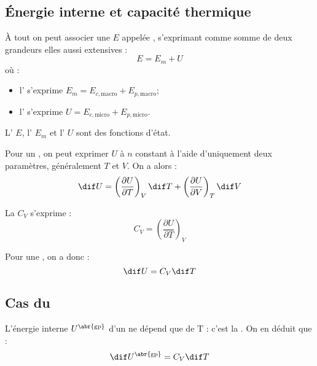 \subsection{Énergie interne et capacité thermique}

\begin{propriete}[admis]
À tout  on peut associer une  $E$ appelée , s'exprimant comme somme de deux grandeurs elles aussi extensives :
\[E = E_m + U\]
où :
\begin{itemize}
\item l' s'exprime $E_m = E_{c, \mathrm{macro}} + E_{p, \mathrm{macro}}$;
\item l' s'exprime $U = E_{c, \mathrm{micro}} + E_{p, \mathrm{micro}}$.
\end{itemize}
\end{propriete}

\begin{propriete}[admis]
L' $E$, l' $E_m$ et l' $U$ sont des fonctions d'état.
\end{propriete}

\begin{propriete}
Pour un , on peut exprimer $U$ à $n$ constant à l'aide d'uniquement deux paramètres, généralement $T$ et $V$. On a alors :
\[\dif U = \left(\frac{\partial U}{\partial T}\right)_V \dif T + \left(\frac{\partial U}{\partial V}\right)_T \dif V\]
\end{propriete}

\begin{definition}
La  $C_V$ s'exprime :
\[C_V = \left(\frac{\partial U}{\partial T}\right)_V\]
\end{definition}

\begin{remarque}
Pour une , on a donc :
\[\dif U = C_V \dif T\]
\end{remarque}



\subsection{Cas du }

\begin{propriete}[admis]
L'énergie interne $U^{\text{\abr{gp}}}$ d'un  ne dépend que de T : c'est la . On en déduit que :
\[\dif U^{\text{\abr{gp}}} = C_V \dif T\]
\end{propriete}

